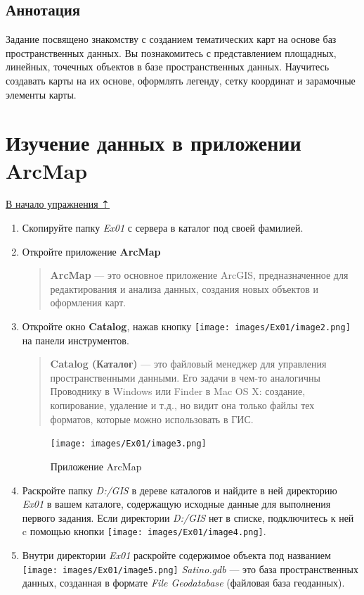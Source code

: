 \documentclass[12pt,]{book}
\begin{document}
\hypertarget{map-design-quaternary-annotation}{%
\subsection{Аннотация}\label{map-design-quaternary-annotation}}

Задание посвящено знакомству с созданием тематических карт на основе баз пространственных данных. Вы познакомитесь с представлением площадных, линейных, точечных объектов в базе пространственных данных. Научитесь создавать карты на их основе, оформлять легенду, сетку координат и зарамочные элементы карты.

\hypertarget{map-design-quaternary-data}{%
\section{Изучение данных в приложении ArcMap}\label{map-design-quaternary-data}}

\protect\hyperlink{map-design-quaternary}{В начало упражнения ⇡}

\begin{enumerate}
\def\labelenumi{\arabic{enumi}.}
\item
  Скопируйте папку \emph{Ex01} с сервера в каталог под своей фамилией.
\item
  Откройте приложение \textbf{ArcMap}

  \begin{quote}
  \textbf{ArcMap} --- это основное приложение ArcGIS, предназначенное для редактирования и анализа данных, создания новых объектов и оформления карт.
  \end{quote}
\item
  Откройте окно \textbf{Catalog}, нажав кнопку \texttt{[image: images/Ex01/image2.png]} на панели инструментов.

  \begin{quote}
  \textbf{Catalog (Каталог)} --- это файловый менеджер для управления пространственными данными. Его задачи в чем-то аналогичны Проводнику в Windows или Finder в Mac OS X: создание, копирование, удаление и т.д., но видит она только файлы тех форматов, которые можно использовать в ГИС.
  \end{quote}

  \begin{figure}
  \centering
  \texttt{[image: images/Ex01/image3.png]}
  \caption{Приложение ArcMap}
  \end{figure}
\item
  Раскройте папку \emph{D:/GIS} в дереве каталогов и найдите в ней директорию \emph{Ex01} в вашем каталоге, содержащую исходные данные для выполнения первого задания. Если директории \emph{D:/GIS} нет в списке, подключитесь к ней c помощью кнопки \texttt{[image: images/Ex01/image4.png]}.
\item
  Внутри директории \emph{Ex01} раскройте содержимое объекта под названием \texttt{[image: images/Ex01/image5.png]} \emph{Satino.gdb} --- это база пространственных данных, созданная в формате \emph{File Geodatabase} (файловая база геоданных).
\end{enumerate}
\end{document}
